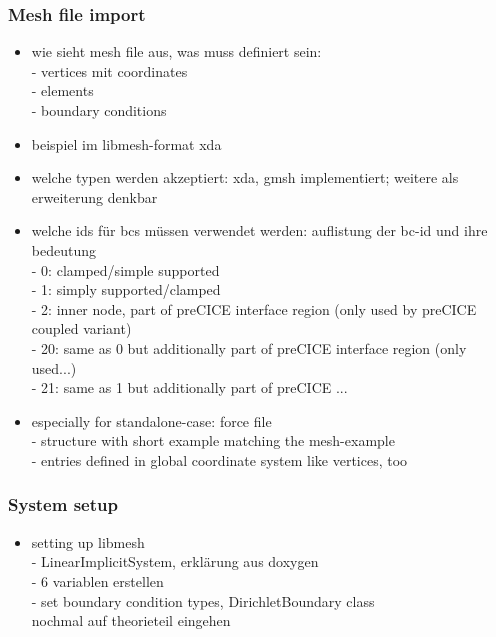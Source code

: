   \subsubsection{Mesh file import}
   \begin{itemize}
   	\item wie sieht mesh file aus, was muss definiert sein:\\
   	- vertices mit coordinates\\
   	- elements\\
   	- boundary conditions
   	
   	\item beispiel im libmesh-format xda
   	
   	\item welche typen werden akzeptiert: xda, gmsh implementiert; weitere als erweiterung denkbar
   	
   	\item welche ids für bcs müssen verwendet werden: auflistung der bc-id und ihre bedeutung\\
   	- 0: clamped/simple supported\\
   	- 1: simply supported/clamped\\
   	- 2: inner node, part of preCICE interface region (only used by preCICE coupled variant)\\
   	- 20: same as 0 but additionally part of preCICE interface region (only used...)\\
   	- 21: same as 1 but additionally part of preCICE ...
   	
   	\item especially for standalone-case: force file\\
   	- structure with short example matching the mesh-example\\
   	- entries defined in global coordinate system like vertices, too
   \end{itemize}
   
   
   
  \subsubsection{System setup}
   \begin{itemize}
  	\item setting up libmesh\\
   	- LinearImplicitSystem, erklärung aus doxygen\\
   	- 6 variablen erstellen\\
    - set boundary condition types, DirichletBoundary class\\
	  nochmal auf theorieteil eingehen
   \end{itemize}
   
